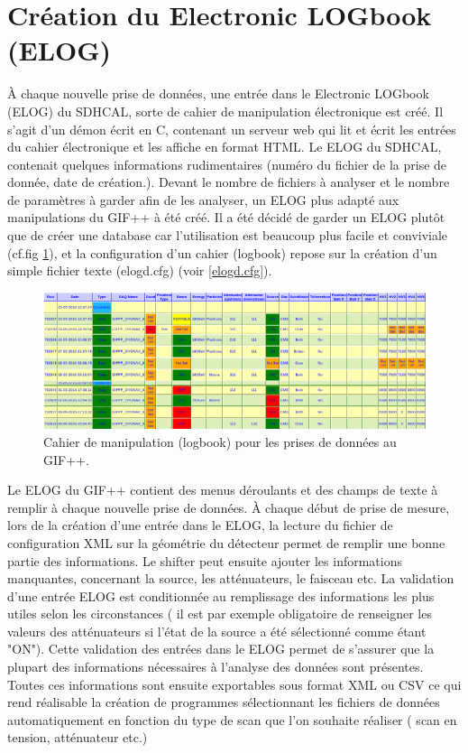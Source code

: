 \section{Création du Electronic LOGbook (ELOG)}
À chaque nouvelle prise de données, une entrée dans le Electronic LOGbook (ELOG) \cite{ELOG} du SDHCAL, sorte de cahier de manipulation électronique est créé. Il s'agit d'un démon écrit en C, contenant un serveur web qui lit et écrit les entrées du cahier électronique et les affiche en format HTML. Le ELOG du SDHCAL, contenait quelques informations rudimentaires (numéro du fichier de la prise de donnée, date de création.). Devant le nombre de fichiers à analyser et le nombre de paramètres à garder afin de les analyser, un ELOG plus adapté aux manipulations du GIF++ à été créé. Il a été décidé de garder un ELOG plutôt que de créer une database car l'utilisation est beaucoup plus facile et conviviale (cf.fig \ref{ELOG}), et la configuration d'un cahier (logbook) repose sur la création d'un simple fichier texte (elogd.cfg) (voir \ref{elogd.cfg}). 

\begin{figure}[!ht]
	\centering
	\includegraphics[width=0.98\linewidth]{GLA/ELOG2.png}
	\caption{Cahier de manipulation (logbook) pour les prises de données au GIF++.}
	\label{ELOG}
\end{figure}

Le ELOG du GIF++ contient des menus déroulants et des champs de texte à remplir à chaque nouvelle prise de données. À chaque début de prise de mesure, lors de la création d'une entrée dans le ELOG, la lecture du fichier de configuration XML sur la géométrie du détecteur permet de remplir une bonne partie des informations. Le shifter peut ensuite ajouter les informations manquantes, concernant la source, les atténuateurs, le faisceau etc. La validation d'une entrée ELOG est conditionnée au remplissage des informations les plus utiles selon les circonstances ( il est par exemple obligatoire de renseigner les valeurs des atténuateurs si l'état de la source a été sélectionné comme étant "ON"). Cette validation des entrées dans le ELOG permet de s'assurer que la plupart des informations nécessaires à l'analyse des données sont présentes. Toutes ces informations sont ensuite exportables sous format XML ou CSV ce qui rend réalisable la création de programmes sélectionnant les fichiers de données automatiquement en fonction du type de scan que l'on souhaite réaliser ( scan en tension, atténuateur etc.)


